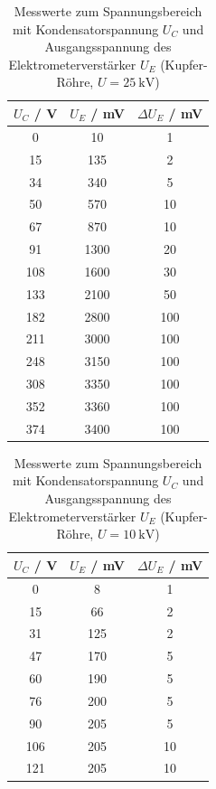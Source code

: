 \documentclass{article}
\begin{document}
\begin{table}[H]
    \centering
    \caption{Messwerte zum Spannungsbereich mit Kondensatorspannung $U_C$ und Ausgangsspannung des Elektrometerverstärker $U_E$ (Kupfer-Röhre, $U = \SI{25}{\kilo\volt}$)}
    \begin{tabular}{|c|c|c|}
        \hline
        $U_C$ / \si{\volt} & $U_E$ / \si{\milli\volt} & $\Delta U_E$ / \si{\milli\volt} \\ \hline \hline
         0 & 10 & 1 \\ \hline
         15 & 135 & 2 \\ \hline
         34 & 340 & 5 \\ \hline
         50 & 570 & 10 \\ \hline
         67 & 870 & 10 \\ \hline
         91 & 1300 & 20 \\ \hline
         108 & 1600 & 30 \\ \hline
         133 & 2100 & 50 \\ \hline
         182 & 2800 & 100 \\ \hline
         211 & 3000 & 100 \\ \hline
         248 & 3150 & 100 \\ \hline
         308 & 3350 & 100 \\ \hline
         352 & 3360 & 100 \\ \hline
         374 & 3400 & 100 \\ \hline
    \end{tabular}
    \label{tab:MesswerteDosimetrie1e}
\end{table}

\begin{table}[H]
    \centering
    \caption{Messwerte zum Spannungsbereich mit Kondensatorspannung $U_C$ und Ausgangsspannung des Elektrometerverstärker $U_E$ (Kupfer-Röhre, $U = \SI{10}{\kilo\volt}$)}
    \begin{tabular}{|c|c|c|}
        \hline
        $U_C$ / \si{\volt} & $U_E$ / \si{\milli\volt} & $\Delta U_E$ / \si{\milli\volt} \\ \hline \hline
         0 & 8 & 1 \\ \hline
         15 & 66 & 2 \\ \hline
         31 & 125 & 2 \\ \hline
         47 & 170 & 5 \\ \hline
         60 & 190 & 5 \\ \hline
         76 & 200 & 5 \\ \hline
         90 & 205 & 5 \\ \hline
         106 & 205 & 10 \\ \hline
         121 & 205 & 10 \\ \hline
    \end{tabular}
    \label{tab:MesswerteDosimetrie1f}
\end{table}
\end{document}
